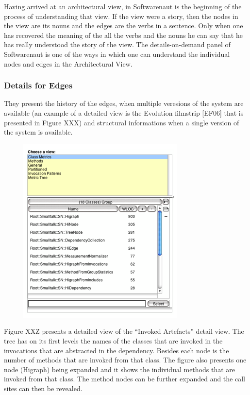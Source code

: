 \documentclass[preprint,12pt]{elsarticle}
\begin{document}
Having arrived at an architectural view, in Softwarenaut is the beginning of the process of understanding that view. If the view were a story, then the nodes in the view are its nouns and the edges are the verbs in a sentence. Only when one has recovered the meaning of the all the verbs and the nouns he can say that he has really understood the story of the view. The details-on-demand panel of Softwarenaut is one of the ways in which one can understand the individual nodes and edges in the Architectural View.


\subsubsection {Details for Edges}
They present the history of the edges, when multiple veresions of the system are available (an example of a detailed view is the Evolution filmstrip [EF06] that is presented in Figure XXX) and structural informations when a single version of the system is available. 

\begin{figure}[h]
\begin{center}
\includegraphics[width=0.5\linewidth]{images/DetailForNode.png}
\caption{}
\label{}
\end{center}
\end{figure}
Figure XXZ presents a detailed view of the “Invoked Artefacts” detail view. The tree has on its first levels the names of the classes that are invoked in the invocations that are abstracted in the dependency. Besides each node is the number of methods that are invoked from that class. The figure also presents one node (Higraph) being expanded and it shows the individual methods that are invoked from that class. The method nodes can be further expanded and the call sites can then be revealed. 
\end{document}
